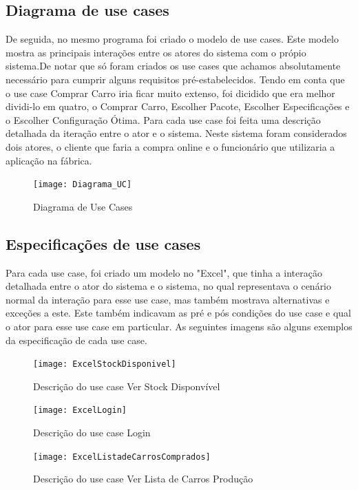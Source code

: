 \documentclass[10pt, a4paper]{article}
\begin{document}
\subsection{Diagrama de use cases}
De seguida, no mesmo programa foi criado o modelo de use cases. Este modelo mostra as principais interações entre os atores do sistema com o própio sistema.De notar que só foram criados os use cases que achamos absolutamente necessário para cumprir alguns requisitos pré-estabelecidos. Tendo em conta que o use case Comprar Carro iria ficar muito extenso, foi dicidido que era melhor dividi-lo em quatro, o Comprar Carro, Escolher Pacote, Escolher Especificações e o Escolher Configuração Ótima. Para cada use case foi feita uma descrição detalhada da iteração entre o ator e o sistema. Neste sistema foram considerados dois atores, o cliente que faria a compra online e o funcionário que utilizaria a aplicação na fábrica.

\begin{figure}[!htb]
\centering
\texttt{[image: Diagrama\_UC]}
\caption{Diagrama de Use Cases}
\label{Diagrama UC}
\end{figure}


\newpage
\subsection{Especificações de use cases}
Para cada use case, foi criado um modelo no "Excel", que tinha a interação detalhada entre o ator do sistema e o sistema, no qual representava o cenário normal da interação para esse use case, mas também mostrava alternativas e exceções a este. Este também indicavam as pré e pós condições do use case e qual o ator para esse use case em particular. As seguintes imagens são alguns exemplos da especificação de cada use case.

\begin{figure}[!htb]
\centering
\texttt{[image: ExcelStockDisponivel]}
\caption{Descrição do use case Ver Stock Disponvível}
\label{EVSD}
\end{figure}

\begin{figure}[!htb]
\centering
\texttt{[image: ExcelLogin]}
\caption{Descrição do use case Login}
\label{EL}
\end{figure}

\begin{figure}[!htb]
\centering
\texttt{[image: ExcelListadeCarrosComprados]}
\caption{Descrição do use case Ver Lista de Carros Produção}
\label{EVCP}
\end{figure}
\end{document}
